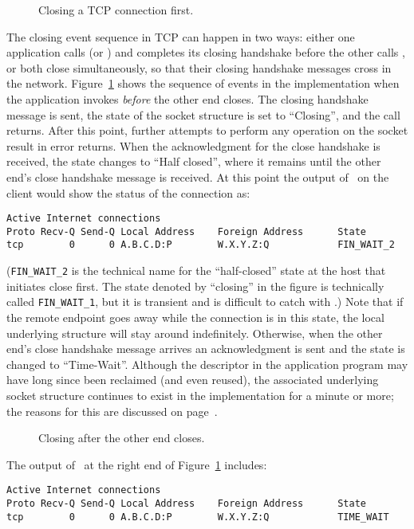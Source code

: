 \begin{figure}
\caption{\label{fsm2}Closing a TCP connection first.}
\end{figure}

The closing event sequence in TCP can happen in two ways: either one
application calls  (or
) and completes
its closing handshake before the other calls
, or both close
simultaneously, so that their
closing handshake messages cross in the network.  Figure~\ref{fsm2}
shows the sequence of events in the implementation when the
application invokes  \emph{before\/}
the other end closes.  The closing handshake message is sent, the
state of the socket structure is set to ``Closing'', and the call
returns.
After this point, further attempts to perform any operation on the
socket result in error returns. %
When the acknowledgment for the close handshake is
received, the state changes to ``Half closed'', where it remains until
the other end's close handshake message is received.
At this point the output of \netstat\ on the
client would show the status of the connection as:
\begin{verbatim}
Active Internet connections
Proto Recv-Q Send-Q Local Address    Foreign Address      State      
tcp        0      0 A.B.C.D:P        W.X.Y.Z:Q            FIN_WAIT_2
\end{verbatim}
(\verb+FIN_WAIT_2+ is the technical name for the ``half-closed'' state at
the host that initiates close first.  The state denoted by ``closing''
in the figure is technically called \verb+FIN_WAIT_1+,
but it is transient and is difficult to catch with \netstat.)
Note that if the
remote endpoint goes away while the connection is in this state, the
local underlying structure will stay around indefinitely.  Otherwise,
when the other end's close handshake message arrives an
acknowledgment is sent and the state is changed to ``Time-Wait''.
Although the descriptor in the application
program may have long since been reclaimed (and even reused),
the associated underlying
socket structure continues to exist in the implementation for a minute or
more; the reasons for this are discussed on
page~\pageref{time-wait-state}.

\begin{figure}
\caption{\label{fsm3}Closing after the other end closes.}
\end{figure}
The output of \netstat\ at the right end of Figure~\ref{fsm2} 
includes:
\begin{verbatim}
Active Internet connections
Proto Recv-Q Send-Q Local Address    Foreign Address      State      
tcp        0      0 A.B.C.D:P        W.X.Y.Z:Q            TIME_WAIT
\end{verbatim}

